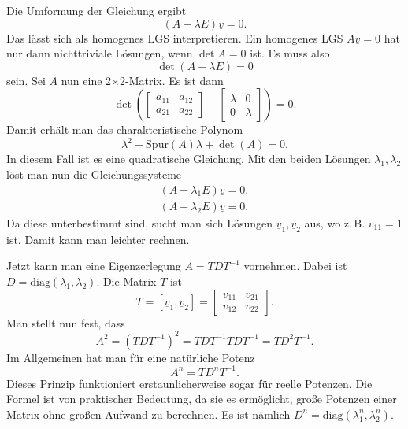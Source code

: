 \documentclass[a4paper,10pt,fleqn,twocolumn,twoside]{article}
\numberwithin{equation}{section}
\begin{document}
Die Umformung der Gleichung ergibt
\begin{equation}
(A-\lambda E)\underline v=0.
\end{equation}
Das lässt sich als homogenes LGS interpretieren. Ein homogenes LGS
$A\underline v=0$ hat nur dann nichttriviale Lösungen,
wenn $\det A=0$ ist. Es muss also
\begin{equation}
\det(A-\lambda E)=0
\end{equation}
sein. Sei $A$ nun eine 2$\times$2-Matrix. Es ist dann
\begin{equation}
\det\left(\begin{bmatrix}a_{11} & a_{12}\\
a_{21} & a_{22}\end{bmatrix}-
\begin{bmatrix}\lambda & 0\\
0 & \lambda\end{bmatrix}\right)=0.
\end{equation}
Damit erhält man das charakteristische Polynom
\begin{equation}
\lambda^2 -\mathrm{Spur}(A)\lambda+\det(A)=0.
\end{equation}
In diesem Fall ist es eine quadratische Gleichung.
Mit den beiden Lösungen $\lambda_1,\lambda_2$ löst man nun
die Gleichungssysteme
\begin{gather*}
(A-\lambda_1 E)\underline v=0,\\
(A-\lambda_2 E)\underline v=0.
\end{gather*}
Da diese unterbestimmt sind, sucht man sich Lösungen
$\underline v_1,\underline v_2$ aus, wo z.\,B. $v_{11}=1$ ist.
Damit kann man leichter rechnen.

Jetzt kann man eine Eigenzerlegung $A=TDT^{-1}$ vornehmen.
Dabei ist $D=\mathrm{diag}(\lambda_1,\lambda_2)$.
Die Matrix $T$ ist
\begin{equation}
T=[\underline v_1, \underline v_2]=\begin{bmatrix}
v_{11} & v_{21}\\
v_{12} & v_{22}
\end{bmatrix}.
\end{equation}
Man stellt nun fest, dass
\begin{equation}
A^2 = (TDT^{-1})^2 = TDT^{-1}TDT^{-1} = TD^2T^{-1}.
\end{equation}
Im Allgemeinen hat man für eine natürliche Potenz
\begin{equation}
A^n = TD^nT^{-1}.
\end{equation}
Dieses Prinzip funktioniert erstaunlicherweise sogar für reelle
Potenzen. Die Formel ist von praktischer Bedeutung, da sie es
ermöglicht, große Potenzen einer Matrix ohne großen Aufwand zu
berechnen. Es ist nämlich
$D^n=\mathrm{diag}(\lambda_1^n,\lambda_2^n)$.
\end{document}
